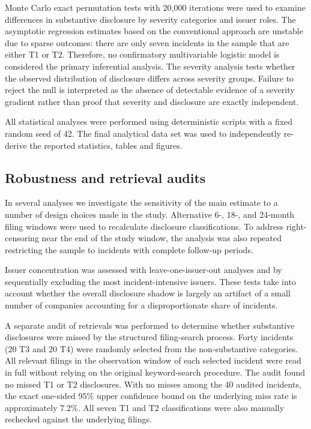 \documentclass[utf8]{FrontiersinHarvard}
\begin{document}
Monte Carlo exact permutation tests with 20,000 iterations were used to examine differences in substantive disclosure by severity categories and issuer roles. The asymptotic regression estimates based on the conventional approach are unstable due to sparse outcomes: there are only seven incidents in the sample that are either T1 or T2. Therefore, no confirmatory multivariable logistic model is considered the primary inferential analysis. The severity analysis tests whether the observed distribution of disclosure differs across severity groups. Failure to reject the null is interpreted as the absence of detectable evidence of a severity gradient rather than proof that severity and disclosure are exactly independent.

All statistical analyses were performed using deterministic scripts with a fixed random seed of 42. The final analytical data set was used to independently re-derive the reported statistics, tables and figures.

\subsection{Robustness and retrieval audits}
In several analyses we investigate the sensitivity of the main estimate to a number of design choices made in the study. Alternative 6-, 18-, and 24-month filing windows were used to recalculate disclosure classifications. To address right-censoring near the end of the study window, the analysis was also repeated restricting the sample to incidents with complete follow-up periods.

Issuer concentration was assessed with leave-one-issuer-out analyses and by sequentially excluding the most incident-intensive issuers. These tests take into account whether the overall disclosure shadow is largely an artifact of a small number of companies accounting for a disproportionate share of incidents.

A separate audit of retrievals was performed to determine whether substantive disclosures were missed by the structured filing-search process. Forty incidents (20 T3 and 20 T4) were randomly selected from the non-substantive categories. All relevant filings in the observation window of each selected incident were read in full without relying on the original keyword-search procedure. The audit found no missed T1 or T2 disclosures. With no misses among the 40 audited incidents, the exact one-sided 95\% upper confidence bound on the underlying miss rate is approximately 7.2\%. All seven T1 and T2 classifications were also manually rechecked against the underlying filings.
\end{document}
